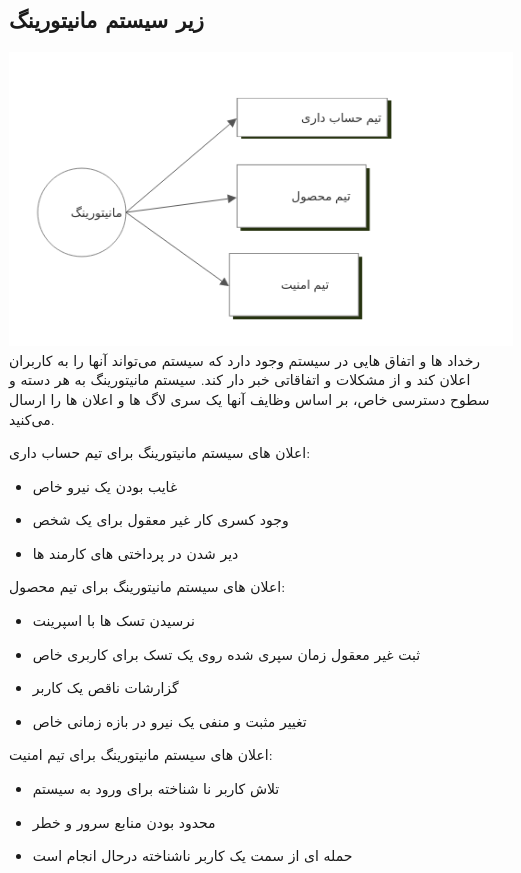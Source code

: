 \subsection{زیر سیستم مانیتورینگ}
\includegraphics[scale=0.8]{assets/monitoring_dfd.png}
رخداد ها و اتفاق هایی در سیستم وجود دارد که سیستم می‌تواند آنها را به کاربران اعلان کند و از مشکلات و اتفاقاتی خبر دار کند.
سیستم مانیتورینگ به هر دسته و سطوح دسترسی خاص، بر اساس وظایف آنها یک سری لاگ ها و اعلان ها را ارسال می‌کنید.

اعلان های سیستم مانیتورینگ برای تیم حساب داری:
\begin{itemize}
	\item غایب بودن یک نیرو خاص
	\item وجود کسری کار غیر معقول برای یک شخص
	\item دیر شدن در پرداختی های کارمند ها 
\end{itemize}

اعلان های سیستم مانیتورینگ برای تیم محصول:
\begin{itemize}
	\item نرسیدن تسک ها با اسپرینت
	\item ثبت غیر معقول زمان سپری شده روی یک تسک برای کاربری خاص
	\item گزارشات ناقص یک کاربر
	\item تغییر مثبت و منفی یک نیرو در بازه زمانی خاص
\end{itemize}

اعلان های سیستم مانیتورینگ برای تیم امنیت:
\begin{itemize}
	\item تلاش کاربر نا شناخته برای ورود به سیستم
	\item محدود بودن منابع سرور و خطر
	\item حمله ای از سمت یک کاربر ناشناخته درحال انجام است
\end{itemize}
